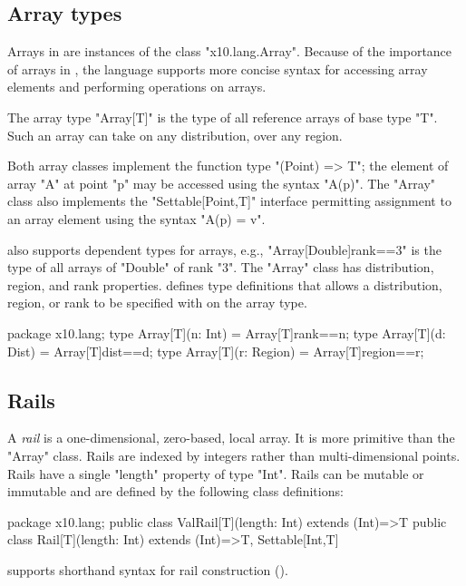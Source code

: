 \subsection{Array types}
\label{ArrayTypeConstructors}

Arrays in \Xten{} are instances of the class
\xcd"x10.lang.Array".
Because of the importance of arrays in \Xten{}, the language
supports more concise syntax for accessing array elements and
performing operations on arrays.


The array type \xcd"Array[T]" is the type of all
reference arrays of base type \xcd"T". Such an array can take on any
distribution, over any region. 


Both array classes implement the function type
\xcd"(Point) => T"; the element of array \xcd"A" at point
\xcd"p" may be accessed using the 
syntax \xcd"A(p)".  The \xcd"Array" class 
also implements the \xcd"Settable[Point,T]" interface 
permitting assignment to an array element using the syntax
\xcd"A(p) = v".

\Xten{} also supports dependent types for arrays,
e.g.,
\xcd"Array[Double]{rank==3}" is the type of all arrays of 
\xcd"Double" of rank \xcd"3".
The \xcd"Array" class has distribution, region, and rank
properties. 
\XtenCurrVer{} defines type definitions that
allows a distribution, region, or rank to be specified 
with on the array type.

\begin{xten}
package x10.lang;
type Array[T](n: Int) = Array[T]{rank==n};
type Array[T](d: Dist) = Array[T]{dist==d};
type Array[T](r: Region) = Array[T]{region==r};
\end{xten}

\subsection{Rails}

A \emph{rail} is a one-dimensional, zero-based, local array. 
It is more primitive than the \xcd"Array" class.
Rails are indexed by integers rather than multi-dimensional
points.  Rails have a single \xcd"length" property of type
\xcd"Int".  Rails can be mutable or immutable and are defined
by the following class definitions:

\begin{xten}
package x10.lang;
public class ValRail[T](length: Int) extends (Int)=>T { }
public class Rail[T](length: Int) extends (Int)=>T, Settable[Int,T] { }
\end{xten}

\Xten{} supports shorthand syntax for rail construction
().

